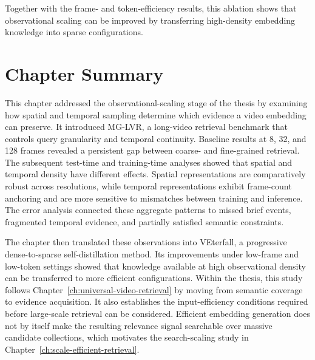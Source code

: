 Together with the frame- and token-efficiency results, this ablation shows that observational scaling can be improved by transferring high-density embedding knowledge into sparse configurations.

\FloatBarrier
\section{Chapter Summary}

This chapter addressed the observational-scaling stage of the thesis by examining how spatial and temporal sampling determine which evidence a video embedding can preserve. It introduced MG-LVR, a long-video retrieval benchmark that controls query granularity and temporal continuity. Baseline results at 8, 32, and 128 frames revealed a persistent gap between coarse- and fine-grained retrieval. The subsequent test-time and training-time analyses showed that spatial and temporal density have different effects. Spatial representations are comparatively robust across resolutions, while temporal representations exhibit frame-count anchoring and are more sensitive to mismatches between training and inference. The error analysis connected these aggregate patterns to missed brief events, fragmented temporal evidence, and partially satisfied semantic constraints.

The chapter then translated these observations into VEterfall, a progressive dense-to-sparse self-distillation method. Its improvements under low-frame and low-token settings showed that knowledge available at high observational density can be transferred to more efficient configurations. Within the thesis, this study follows Chapter~\ref{ch:universal-video-retrieval} by moving from semantic coverage to evidence acquisition. It also establishes the input-efficiency conditions required before large-scale retrieval can be considered. Efficient embedding generation does not by itself make the resulting relevance signal searchable over massive candidate collections, which motivates the search-scaling study in Chapter~\ref{ch:scale-efficient-retrieval}.
